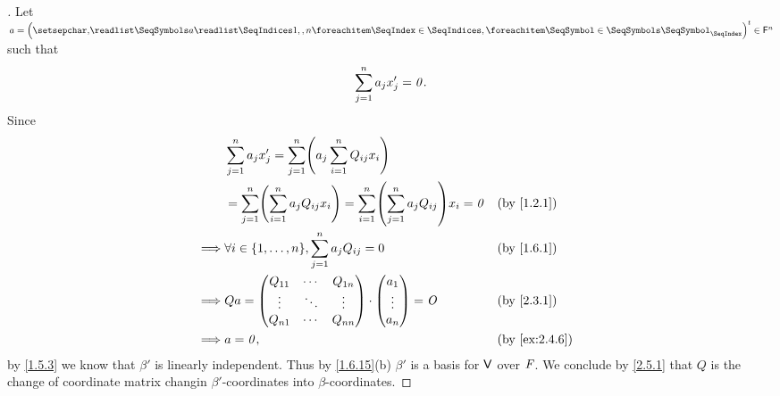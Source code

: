 \begin{proof}[]
  Let \(a = \tp{\tuple{a}{1,,n}} \in \vs{F}^n\) such that
  \[
    \sum_{j = 1}^n a_j x_j' = \mathit{0}.
  \]
  Since
  \begin{align*}
             & \sum_{j = 1}^n a_j x_j' = \sum_{j = 1}^n \pa{a_j \sum_{i = 1}^n Q_{i j} x_i}                                                                           \\
             & = \sum_{j = 1}^n \pa{\sum_{i = 1}^n a_j Q_{i j} x_i} = \sum_{i = 1}^n \pa{\sum_{j = 1}^n a_j Q_{i j}} x_i = \zv &  & \text{(by \cref{1.2.1})}          \\
    \implies & \forall i \in \set{1, \dots, n}, \sum_{j = 1}^n a_j Q_{i j} = 0                                                 &  & \text{(by \cref{1.6.1})}          \\
    \implies & Qa = \begin{pmatrix}
                      Q_{1 1} & \cdots & Q_{1 n} \\
                      \vdots  & \ddots & \vdots  \\
                      Q_{n 1} & \cdots & Q_{n n}
                    \end{pmatrix} \cdot \begin{pmatrix}
                                          a_1    \\
                                          \vdots \\
                                          a_n
                                        \end{pmatrix} = \zm                                                                             &  & \text{(by \cref{2.3.1})} \\
    \implies & a = \zv,                                                                                                        &  & \text{(by \cref{ex:2.4.6})}
  \end{align*}
  by \cref{1.5.3} we know that \(\beta'\) is linearly independent.
  Thus by \cref{1.6.15}(b) \(\beta'\) is a basis for \(\mathsf{V}\) over \(\mathit{F}\).
  We conclude by \cref{2.5.1} that \(Q\) is the change of coordinate matrix changin \(\beta'\)-coordinates into \(\beta\)-coordinates.
\end{proof}
